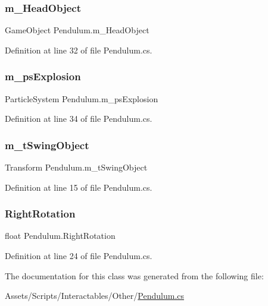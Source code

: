 \subsubsection{\texorpdfstring{m\+\_\+\+Head\+Object}{m\_HeadObject}}
{\footnotesize\ttfamily Game\+Object Pendulum.\+m\+\_\+\+Head\+Object}



Definition at line 32 of file Pendulum.\+cs.

\mbox{\label{class_pendulum_ad72d7ca75ee2d3db8de1faceb3aa74b2}} 
\subsubsection{\texorpdfstring{m\+\_\+ps\+Explosion}{m\_psExplosion}}
{\footnotesize\ttfamily Particle\+System Pendulum.\+m\+\_\+ps\+Explosion}



Definition at line 34 of file Pendulum.\+cs.

\mbox{\label{class_pendulum_a1f4b8a46360de1da1a0326e5968e1959}} 
\subsubsection{\texorpdfstring{m\+\_\+t\+Swing\+Object}{m\_tSwingObject}}
{\footnotesize\ttfamily Transform Pendulum.\+m\+\_\+t\+Swing\+Object}



Definition at line 15 of file Pendulum.\+cs.

\mbox{\label{class_pendulum_aba3b1c8ada6a5211ee0bc50303ee40ca}} 
\subsubsection{\texorpdfstring{Right\+Rotation}{RightRotation}}
{\footnotesize\ttfamily float Pendulum.\+Right\+Rotation}



Definition at line 24 of file Pendulum.\+cs.



The documentation for this class was generated from the following file\+:\begin{DoxyCompactItemize}
\item 
Assets/\+Scripts/\+Interactables/\+Other/\mbox{\hyperlink{_pendulum_8cs}{Pendulum.\+cs}}\end{DoxyCompactItemize}
